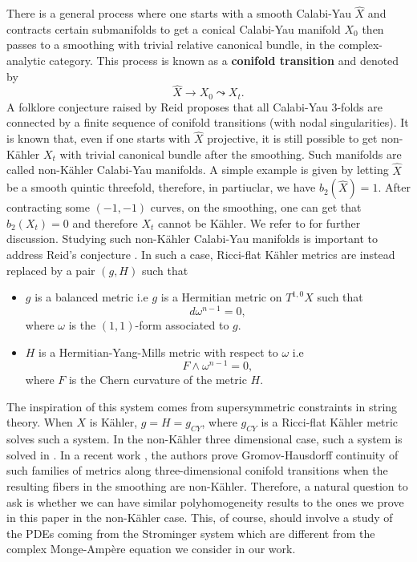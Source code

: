 \documentclass[a4paper,11pt]{article}
\begin{document}
There is a general process where one starts with a smooth Calabi-Yau $\hat{X}$ and contracts certain submanifolds to get a conical Calabi-Yau manifold $X_0$ then passes to a smoothing with trivial relative canonical bundle, in the complex-analytic category. This process is known as a \textbf{conifold transition} and denoted by 
$$
\hat{X} \rightarrow X_0 \leadsto X_t.
$$
A folklore conjecture raised by Reid \cite{reid1987moduli} proposes that all Calabi-Yau 3-folds are connected by a finite sequence of conifold transitions (with nodal singularities). It is known that, even if one starts with $\hat X$ projective, it is still possible to get non-Kähler $X_t$ with trivial canonical bundle after the smoothing. Such manifolds are called non-Kähler Calabi-Yau manifolds. A simple example is given by letting $\hat{X}$ be a smooth quintic threefold, therefore, in partiuclar, we have $b_2(\hat{X})=1$. After contracting some $(-1,-1)$ curves, on the smoothing, one can get that $b_2(X_t)=0$ and therefore $X_t$ cannot be Kähler. We refer to \cite{friedman1991threefolds} for further discussion. Studying such non-Kähler Calabi-Yau manifolds is important to address Reid's conjecture \cite{reid1987moduli}. In such a case, Ricci-flat Kähler metrics are instead replaced by a pair $(g, H)$ such that  
\begin{itemize}
    \item $g$ is a balanced metric i.e $g$ is a Hermitian metric on $T^{1,0}X$ such that 
    $$
    d \omega^{n-1} =0,
    $$
    where $\omega$ is the $(1,1)$-form associated to $g$. 
    \item $H$ is a Hermitian-Yang-Mills metric with respect to $\omega$ i.e 
    $$
    F \wedge \omega^{n-1} =0,
    $$
    where $F$ is the Chern curvature of the metric $H$.
\end{itemize}
The inspiration of this system comes from supersymmetric constraints in string theory. When $X$ is Kähler, $g=H=g_{CY}$, where $g_{CY}$ is a Ricci-flat Kähler metric solves such a system. In the non-Kähler three dimensional case, such a system is solved in \cite{fu2012balanced, collins2024stability}. In a recent work \cite{friedman_gromov-hausdorff_2024}, the authors prove Gromov-Hausdorff continuity of such families of metrics along three-dimensional conifold transitions when the resulting fibers in the smoothing are non-Kähler. Therefore, a natural question to ask is whether we can have similar polyhomogeneity results to the ones we prove in this paper in the non-Kähler case. This, of course, should involve a study of the PDEs coming from the Strominger system which are different from the complex Monge-Ampère equation we consider in our work.\\
\end{document}
